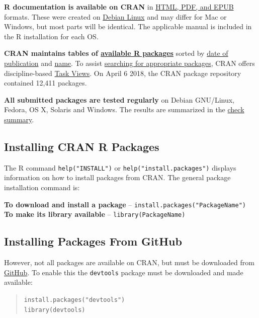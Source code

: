 \documentclass[]{book}
\theoremstyle{definition}
\theoremstyle{definition}
\theoremstyle{definition}
\theoremstyle{remark}
\begin{document}
\textbf{R documentation is available on CRAN} in
\href{https://cran.r-project.org/manuals.html\#R-admin}{HTML, PDF, and
EPUB} formats. These were created on \href{https://debian.org}{Debian
Linux} and may differ for Mac or Windows, but most parts will be
identical. The applicable manual is included in the R installation for
each OS.

\textbf{CRAN maintains tables of
\href{https://cran.r-project.org/}{available R packages}} sorted by
\href{https://cran.r-project.org/web/packages/available_packages_by_date.html}{date
of publication} and
\href{https://cran.r-project.org/web/packages/available_packages_by_name.html}{name}.
To assist \href{https://cran.r-project.org/}{searching for appropriate
packages}, CRAN offers discipline-based
\href{https://cran.r-project.org/web/views/}{Task Views}. On April 6
2018, the CRAN package repository contained 12,411 packages.

\textbf{All submitted packages are tested regularly} on Debian
GNU/Linux, Fedora, OS X, Solaris and Windows. The results are summarized
in the
\href{https://cran.r-project.org/web/checks/check_summary.html}{check
summary}.

\hypertarget{installing-cran-r-packages}{%
\subsection{Installing CRAN R
Packages}\label{installing-cran-r-packages}}

The R command \texttt{help("INSTALL")} or
\texttt{help("install.packages")} displays information on how to install
packages from CRAN. The general package installation command is:

\textbf{To download and install a package} --
\texttt{install.packages("PackageName")}\\
\textbf{To make its library available} -- \texttt{library(PackageName)}

\hypertarget{installing-packages-from-github}{%
\subsection{Installing Packages From
GitHub}\label{installing-packages-from-github}}

However, not all packages are available on CRAN, but must be downloaded
from \href{https://github.com/}{GitHub}. To enable this the
\texttt{devtools} package must be downloaded and made available:

\begin{quote}
\texttt{install.packages("devtools")}~\\
\texttt{library(devtools)}
\end{quote}
\end{document}
